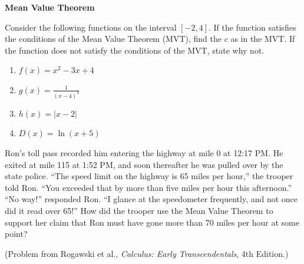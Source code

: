 \documentclass{ximera}
\begin{document}
\textbf{Mean Value Theorem}
\begin{exercise}
   Consider the following functions on the interval $[-2,4]$.  If the function satisfies the conditions of the Mean Value Theorem (MVT), find the $c$ as in the MVT.  If the function does not satisfy the conditions of the MVT, state why not.  
    \begin{enumerate}
       \item $f(x)=x^2-3x+4$\\
       \item $g(x)=\frac{1}{(x-4)^3}$\\
       \item $h(x)=|x-2|$\\
       \item $D(x)=\ln(x+5)$\\
    \end{enumerate}

\end{exercise}

\begin{exercise}
   Ron’s toll pass recorded him entering the highway at mile 0 at 12:17 PM. He exited at mile 115 at 1:52 PM, and soon thereafter he was pulled over by the state police. “The speed limit on the highway is 65 miles per hour,” the trooper told Ron. “You exceeded that by more than five miles per hour this afternoon.” “No way!” responded Ron. “I glance at the speedometer frequently, and not once did it read over 65!” How did the trooper use the Mean Value Theorem to support her claim that Ron must have gone more than 70 miles per hour at some point? 

(Problem from Rogawski et al., \textit{Calculus: Early Transcendentals}, 4th Edition.)
\end{exercise}
\end{document}
